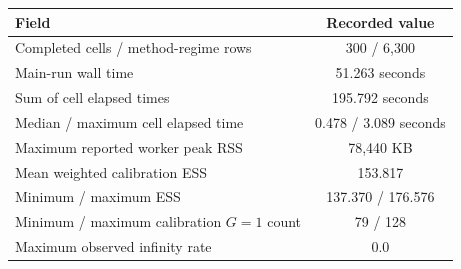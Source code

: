 \begin{tabular}{lc}
\toprule
Field & Recorded value \\
\midrule
Completed cells / method-regime rows & 300 / 6,300 \\
Main-run wall time & 51.263 seconds \\
Sum of cell elapsed times & 195.792 seconds \\
Median / maximum cell elapsed time & 0.478 / 3.089 seconds \\
Maximum reported worker peak RSS & 78,440 KB \\
Mean weighted calibration ESS & 153.817 \\
Minimum / maximum ESS & 137.370 / 176.576 \\
Minimum / maximum calibration $G=1$ count & 79 / 128 \\
Maximum observed infinity rate & 0.0 \\
\bottomrule
\end{tabular}
